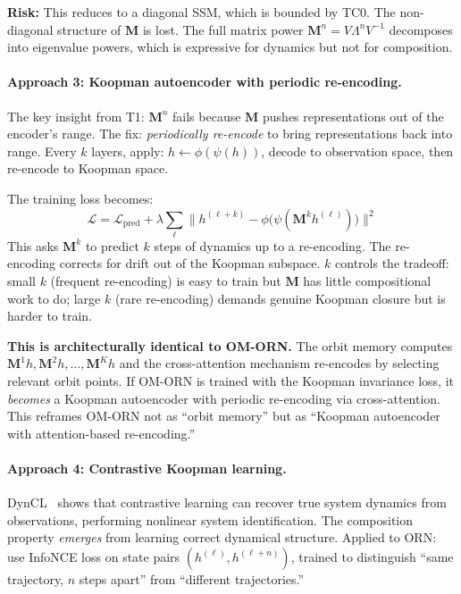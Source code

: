 \documentclass[11pt, a4paper]{article}
\newcommand{\M}{\mathbf{M}}
\theoremstyle{plain}
\theoremstyle{remark}
\begin{document}
\textbf{Risk:} This reduces to a diagonal SSM, which is bounded by TC0.
The non-diagonal structure of $\M$ is lost.
The full matrix power $\M^n = V \Lambda^n V^{-1}$ decomposes into eigenvalue powers, which is expressive for dynamics but not for composition.

\paragraph{Approach 3: Koopman autoencoder with periodic re-encoding.}
The key insight from T1: $\M^n$ fails because $\M$ pushes representations out of the encoder's range.
The fix: \emph{periodically re-encode} to bring representations back into range.
Every $k$ layers, apply: $h \leftarrow \phi(\psi(h))$, decode to observation space, then re-encode to Koopman space.

The training loss becomes:
\begin{equation}
    \mathcal{L} = \mathcal{L}_{\text{pred}} + \lambda \sum_{\ell} \bigl\| h^{(\ell+k)} - \phi\bigl(\psi(\M^k h^{(\ell)})\bigr) \bigr\|^2
\end{equation}
This asks $\M^k$ to predict $k$ steps of dynamics up to a re-encoding.
The re-encoding corrects for drift out of the Koopman subspace.
$k$ controls the tradeoff: small $k$ (frequent re-encoding) is easy to train but $\M$ has little compositional work to do; large $k$ (rare re-encoding) demands genuine Koopman closure but is harder to train.

\textbf{This is architecturally identical to OM-ORN.}
The orbit memory computes $\M^1 h, \M^2 h, \ldots, \M^K h$ and the cross-attention mechanism re-encodes by selecting relevant orbit points.
If OM-ORN is trained with the Koopman invariance loss, it \emph{becomes} a Koopman autoencoder with periodic re-encoding via cross-attention.
This reframes OM-ORN not as ``orbit memory'' but as ``Koopman autoencoder with attention-based re-encoding.''

\paragraph{Approach 4: Contrastive Koopman learning.}
DynCL~\cite{dyncl2025} shows that contrastive learning can recover true system dynamics from observations, performing nonlinear system identification.
The composition property \emph{emerges} from learning correct dynamical structure.
Applied to ORN: use InfoNCE loss on state pairs $(h^{(\ell)}, h^{(\ell+n)})$, trained to distinguish ``same trajectory, $n$ steps apart'' from ``different trajectories.''
\end{document}
